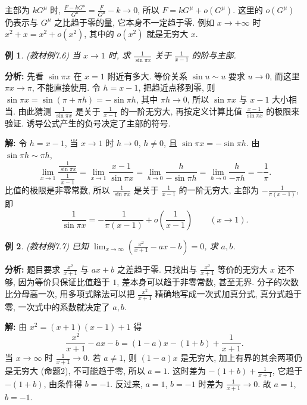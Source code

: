 \documentclass[UTF8,openany]{ctexbook}
\theoremstyle{chinesetextbook}
\newtheorem{example}{例}[section]
\newenvironment{cnsolution}{\par\indent\textbf{解:} \ignorespaces}{\par}
\begin{document}
主部为 $kG^\mu$ 时, $\displaystyle\frac{F-kG^\mu}{G^\mu}=\frac F{G^\mu}-k\to0$, 所以 $F=kG^\mu+o(G^\mu)$. 这里的 $o(G^\mu)$ 仍表示与 $G^\mu$ 之比趋于零的量, 它本身不一定趋于零. 例如 $x\to+\infty$ 时 $x^2+x=x^2+o(x^2)$, 其中的 $o(x^2)$ 就是无穷大 $x$.
\begin{example}\label{ex:7-6}
\textnormal{(教材例7.6)} 当 $x\to1$ 时, 求 $\displaystyle\frac1{\sin\pi x}$ 关于 $\displaystyle\frac1{x-1}$ 的阶与主部.
\end{example}
\par\indent\textbf{分析:} 先看 $\sin\pi x$ 在 $x=1$ 附近有多大. 等价关系 $\sin u\sim u$ 要求 $u\to0$, 而这里 $\pi x\to\pi$, 不能直接使用. 令 $h=x-1$, 把趋近点移到零, 则 $\sin\pi x=\sin(\pi+\pi h)=-\sin\pi h$, 其中 $\pi h\to0$, 所以 $\sin\pi x$ 与 $x-1$ 大小相当. 由此猜测 $\displaystyle\frac1{\sin\pi x}$ 是关于 $\displaystyle\frac1{x-1}$ 的一阶无穷大, 再按定义计算比值 $\displaystyle\frac{x-1}{\sin\pi x}$ 的极限来验证. 诱导公式产生的负号决定了主部的符号.
\begin{cnsolution}
令 $h=x-1$, 当 $x\to1$ 时 $h\to0$, $h\ne0$, 且 $\sin\pi x=-\sin\pi h$. 由 $\sin\pi h\sim\pi h$,
\[
\lim_{x\to1}\frac{\frac1{\sin\pi x}}{\frac1{x-1}}=\lim_{x\to1}\frac{x-1}{\sin\pi x}=\lim_{h\to0}\frac h{-\sin\pi h}=\lim_{h\to0}\frac h{-\pi h}=-\frac1\pi.
\]
比值的极限是非零常数, 所以 $\displaystyle\frac1{\sin\pi x}$ 是关于 $\displaystyle\frac1{x-1}$ 的一阶无穷大, 主部为 $\displaystyle-\frac1{\pi(x-1)}$, 即
\[
\frac1{\sin\pi x}=-\frac1{\pi(x-1)}+o\!\left(\frac1{x-1}\right)\qquad(x\to1).
\]
\end{cnsolution}
\begin{example}
\textnormal{(教材例7.7)} 已知 $\displaystyle\lim_{x\to\infty}\left(\frac{x^2}{x+1}-ax-b\right)=0$, 求 $a,b$.
\end{example}
\par\indent\textbf{分析:} 题目要求 $\displaystyle\frac{x^2}{x+1}$ 与 $ax+b$ 之差趋于零. 只找出与 $\displaystyle\frac{x^2}{x+1}$ 等价的无穷大 $x$ 还不够, 因为等价只保证比值趋于 $1$, 差本身可以趋于非零常数, 甚至无界. 分子的次数比分母高一次, 用多项式除法可以把 $\displaystyle\frac{x^2}{x+1}$ 精确地写成一次式加真分式, 真分式趋于零, 一次式中的系数就决定了 $a,b$.
\begin{cnsolution}
由 $x^2=(x+1)(x-1)+1$ 得
\[
\frac{x^2}{x+1}-ax-b=(1-a)x-(1+b)+\frac1{x+1}.
\]
当 $x\to\infty$ 时 $\displaystyle\frac1{x+1}\to0$. 若 $a\ne1$, 则 $(1-a)x$ 是无穷大, 加上有界的其余两项仍是无穷大 (命题2), 不可能趋于零, 所以 $a=1$. 这时差为 $\displaystyle-(1+b)+\frac1{x+1}$, 它趋于 $-(1+b)$, 由条件得 $b=-1$. 反过来, $a=1$, $b=-1$ 时差为 $\displaystyle\frac1{x+1}\to0$. 故 $a=1$, $b=-1$.
\end{cnsolution}
\end{document}
